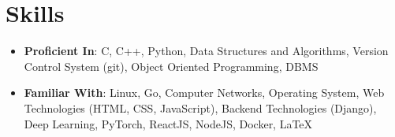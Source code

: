 \documentclass[a4paper,11pt]{article}
\newcommand{\resumeSubHeadingListStart}{\begin{itemize}[leftmargin=*, topsep=0pt]}
\newcommand{\resumeSubHeadingListEnd}{\end{itemize}}
\newcommand{\resumeItemListStart}{\begin{itemize}}
\newcommand{\resumeItemListEnd}{\end{itemize}\vspace{-5pt}}
\begin{document}
\section{Skills}
 \resumeSubHeadingListStart
    \setlength{\itemsep}{1pt}
     \item\textbf{Proficient In}{: C, C++, Python, Data Structures and Algorithms, Version Control System (git), Object Oriented Programming, DBMS}\\
     \item\textbf{Familiar With}{: Linux, Go, Computer Networks, Operating System, Web Technologies (HTML, CSS, JavaScript), Backend Technologies (Django), Deep Learning, PyTorch, ReactJS, NodeJS, Docker, \LaTeX}
 \resumeSubHeadingListEnd
 
\end{document}
